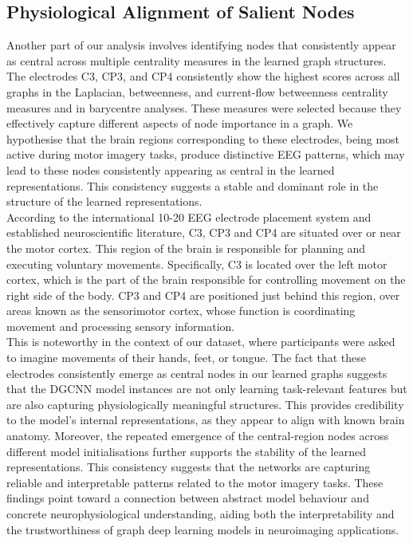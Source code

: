 \subsection{Physiological Alignment of Salient Nodes}
Another part of our analysis involves identifying nodes that consistently appear as central across multiple centrality measures in the learned graph structures. The electrodes C3, CP3, and CP4 consistently show the highest scores across all graphs in the Laplacian, betweenness, and current-flow betweenness centrality measures and in barycentre analyses. These measures were selected because they effectively capture different aspects of node importance in a graph. We hypothesise that the brain regions corresponding to these electrodes, being most active during motor imagery tasks, produce distinctive EEG patterns, which may lead to these nodes consistently appearing as central in the learned representations. This consistency suggests a stable and dominant role in the structure of the learned representations.
\vspace{0.5em}\\
According to the international 10-20 EEG electrode placement system and established neuroscientific literature, C3, CP3 and CP4 are situated over or near the motor cortex. This region of the brain is responsible for planning and executing voluntary movements. Specifically, C3 is located over the left motor cortex, which is the part of the brain responsible for controlling movement on the right side of the body. CP3 and CP4 are positioned just behind this region, over areas known as the sensorimotor cortex, whose function is coordinating movement and processing sensory information. 
\vspace{0.5em}\\
This is noteworthy in the context of our dataset, where participants were asked to imagine movements of their hands, feet, or tongue. The fact that these electrodes consistently emerge as central nodes in our learned graphs suggests that the DGCNN model instances are not only learning task-relevant features but are also capturing physiologically meaningful structures. This provides credibility to the model’s internal representations, as they appear to align with known brain anatomy. Moreover, the repeated emergence of the central-region nodes across different model initialisations further supports the stability of the learned representations. This consistency suggests that the networks are capturing reliable and interpretable patterns related to the motor imagery tasks. These findings point toward a connection between abstract model behaviour and concrete neurophysiological understanding, aiding both the interpretability and the trustworthiness of graph deep learning models in neuroimaging applications.
